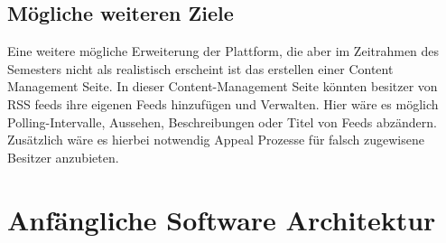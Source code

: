 \subsection{Mögliche weiteren Ziele}
Eine weitere mögliche Erweiterung der Plattform, die aber im Zeitrahmen des Semesters nicht als realistisch erscheint ist das erstellen einer Content Management Seite.
In dieser Content-Management Seite könnten besitzer von RSS feeds ihre eigenen Feeds hinzufügen und Verwalten.
Hier wäre es möglich Polling-Intervalle, Aussehen, Beschreibungen oder Titel von Feeds abzändern.
Zusätzlich wäre es hierbei notwendig Appeal Prozesse für falsch zugewisene Besitzer anzubieten.

\section{Anfängliche Software Architektur}
